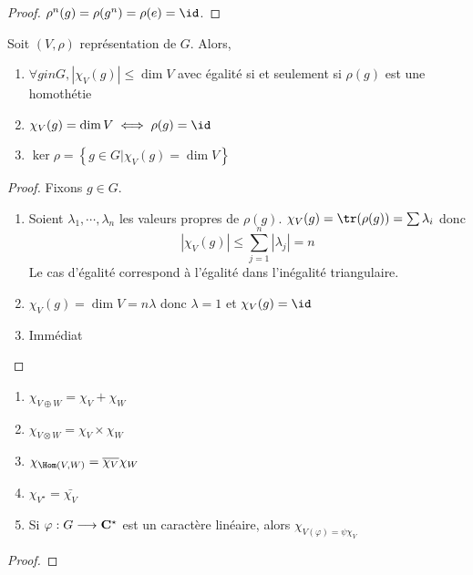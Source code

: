 \begin{proof}
    $\rho^n(g)=\rho(g^n)=\rho(e)=\id$.
\end{proof}

\begin{prop}
    Soit $(V, \rho)$ représentation de  $G$. Alors,  \begin{enumerate}
        \item $\forall  g in G, |\chi_V(g)|\leq \dim V$ avec égalité si et seulement si $\rho(g)$ est une homothétie
        \item $\chi_V(g)=\dim V \iff  \rho(g)=\id$
        \item $\ker \rho = \left\{ g \in  G | \chi_V(g)=\dim V \right\} $
    \end{enumerate}
\end{prop}

\begin{proof}
Fixons $g \in  G$. \begin{enumerate}
    \item Soient $\lambda_1, \cdots , \lambda_n$ les valeurs propres de $\rho(g)$.  $\chi_V(g)=\tr(\rho(g))=\sum \lambda_i$ donc \[|\chi_V(g)|\leq \sum_{j=1}^n|\lambda_j|=n\]
        Le cas d'égalité correspond à l'égalité dans l'inégalité triangulaire.
    \item $\chi_V(g)=\dim V=n\lambda$ donc $ \lambda=1$ et $\chi_V(g)=\id$
    \item Immédiat
\end{enumerate}
\end{proof}

\begin{prop}
\begin{enumerate}
    \item $\chi_{V\oplus W}=\chi_V+\chi_W$ 
    \item $\chi_{V\otimes W}=\chi_V\times \chi_W$
    \item  $\chi_{\Hom(V, W)}=\bar{\chi_V}\chi_W$
    \item $\chi_{V^\star}=\bar{\chi_V}$
    \item Si $\varphi: G \longrightarrow  \mathbf C^\star$ est un caractère linéaire, alors $\chi_{V(\varphi)=\psi\chi_V}$
\end{enumerate}
\end{prop}

\begin{proof}

\end{proof}
